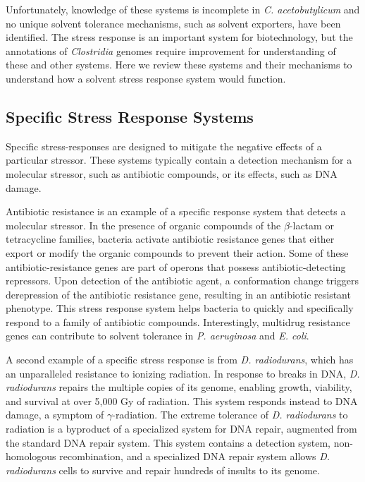 Unfortunately, knowledge of these systems is incomplete in \textit{C. acetobutylicum} and no unique solvent tolerance mechanisms, such as solvent exporters, have been identified. The stress response is an important system for biotechnology, but the annotations of \textit{Clostridia} genomes require improvement for understanding of these and other systems. Here we review these systems and their mechanisms to understand how a solvent stress response system would function.


\subsection{Specific Stress Response Systems}
Specific stress-responses are designed to mitigate the negative effects of a particular stressor. These systems typically contain a detection mechanism for a molecular stressor, such as antibiotic compounds,\cite{127} or its effects, such as DNA damage.\cite{128}

Antibiotic resistance is an example of a specific response system that detects a molecular stressor. In the presence of organic compounds of the $\beta$-lactam\cite{127} or tetracycline families,\cite{130} bacteria activate antibiotic resistance genes that either export or modify the organic compounds to prevent their action. Some of these antibiotic-resistance genes are part of operons that possess antibiotic-detecting repressors.\cite{127} Upon detection of the antibiotic agent, a conformation change triggers derepression of the antibiotic resistance gene, resulting in an antibiotic resistant phenotype. This stress response system helps bacteria to quickly and specifically respond to a family of antibiotic compounds. Interestingly, multidrug resistance genes can contribute to solvent tolerance in \textit{P. aeruginosa}\cite{203} and \textit{E. coli}.

A second example of a specific stress response is from \textit{D. radiodurans}, which has an unparalleled resistance to ionizing radiation.\cite{129} In response to breaks in DNA, \textit{D. radiodurans} repairs the multiple copies of its genome, enabling growth, viability, and survival at over 5,000 Gy of radiation.\cite{129} This system responds instead to DNA damage, a symptom of $\gamma$-radiation. The extreme tolerance of \textit{D. radiodurans} to radiation is a byproduct of a specialized system for DNA repair,\cite{129} augmented from the standard DNA repair system.\cite{128} This system contains a detection system, non-homologous recombination, and a specialized DNA repair system allows \textit{D. radiodurans} cells to survive and repair hundreds of insults to its genome. 

